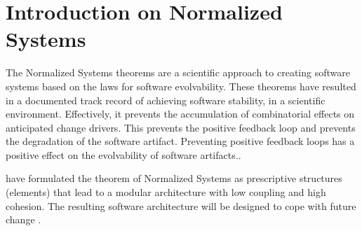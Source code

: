 \section{Introduction on Normalized Systems} \label{sec:inro_ns}

The Normalized Systems theorems are a scientific approach to creating software systems
based on the laws for software evolvability. These theorems have resulted in a documented
track record of achieving software stability, in a scientific environment. Effectively, it
prevents the accumulation of combinatorial effects on anticipated change drivers. This
prevents the positive feedback loop and prevents the degradation of the software artifact.
Preventing positive feedback loops has a positive effect on the evolvability of software
artifacts.\parencite[]{mannaert_normalized_2009}. 

\citeauthor[]{mannaert_normalized_2009} have formulated the theorem of Normalized Systems
as prescriptive structures (elements) that lead to a modular architecture with low
coupling and high cohesion. The resulting software architecture will be designed to cope
with future change \parencites[]{mannaert_normalized_2009}.